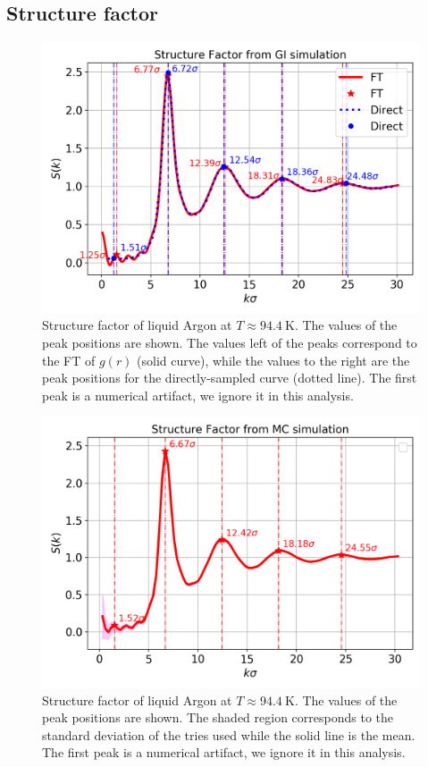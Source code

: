 \documentclass[%
aps,
pra,%
amsmath,amssymb,
preprint,%
reprint,%
notitlepage,
a4paper]{revtex4-1}
\begin{document}
\subsection{Structure factor}
\begin{figure}
	\centering
	\includegraphics[width=0.99\linewidth]{../task2/results/sofk}
	\caption{Structure factor of liquid Argon at $T\approx\SI{94.4}{\kelvin}$. The values of the peak positions are shown. The values left of the peaks correspond to the FT of $g(r)$ (solid curve), while the values to the right are the peak positions for the directly-sampled curve (dotted line). The first peak is a numerical artifact, we ignore it in this analysis.}
	\label{fig:sofk}
\end{figure}
\begin{figure}
	\centering
	\includegraphics[width=0.99\linewidth]{../task2/results/sofk_mc}
	\caption{Structure factor of liquid Argon at $T\approx\SI{94.4}{\kelvin}$. The values of the peak positions are shown. The shaded region corresponds to the standard deviation of the tries used while the solid line is the mean. The first peak is a numerical artifact, we ignore it in this analysis.}
	\label{fig:sofk_mc}
\end{figure}
\end{document}
